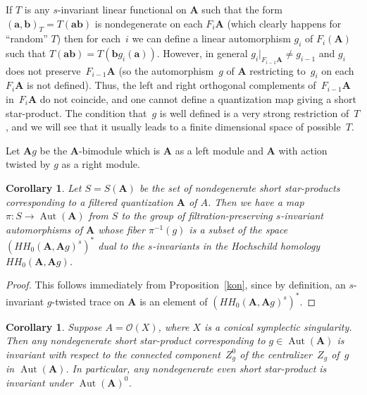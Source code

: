 \documentclass[pdftex]{sigma}
\numberwithin{equation}{section}
\newtheorem{Corollary}[Theorem]{Corollary}
\begin{document}
\begin{Remark} If $T$ is any $s$-invariant linear functional on ${\mathbf A}$ such that the form $({\mathbf a},{\mathbf b})_T=T({\mathbf a}{\mathbf b})$ is nondegenerate on each $F_i{\mathbf A}$ (which clearly happens for ``random'' $T$) then for each~$i$ we can define a linear automorphism $g_i$ of $F_i({\mathbf A})$ such that $T({\textbf{ab}})=T({\mathbf b}g_i({\mathbf a}))$. However, in general $g_i|_{F_{i-1}{\mathbf A}}\ne g_{i-1}$ and $g_i$ does not preserve~$F_{i-1}{\mathbf A}$ (so the automorphism~$g$ of ${\mathbf A}$ restricting to~$g_i$ on each $F_i{\mathbf A}$ is not defined). Thus, the left and right orthogonal complements of~$F_{i-1}{\mathbf A}$ in~$F_i{\mathbf A}$ do not coincide, and one cannot define a quantization map giving a short star-product. The condition that~$g$ is well defined is a very strong restriction of~$T$, and we will see that it usually leads to a finite dimensional space of possible~$T$.
\end{Remark}

Let ${\mathbf A}g$ be the ${\mathbf A}$-bimodule which is ${\mathbf A}$ as a left module and ${\mathbf A}$ with action twisted by $g$ as a right module.

\begin{Corollary}\label{bun} Let $S=S({\mathbf A})$ be the set of nondegenerate short star-products corresponding to a filtered quantization ${{\mathbf A}}$ of $A$. Then we have a map $\pi\colon S\to \operatorname{Aut}({{\mathbf A}})$ from $S$ to the group of filtration-preserving $s$-invariant automorphisms of ${{\mathbf A}}$ whose fiber $\pi^{-1}(g)$ is a subset of the space $(HH_0({{\mathbf A}},{{\mathbf A}}g)^s)^*$ dual to the $s$-invariants in the Hochschild homology $HH_0({{\mathbf A}},{{\mathbf A}}g)$.
\end{Corollary}

\begin{proof} This follows immediately from Proposition~\ref{kon}, since by definition, an $s$-invariant $g$-twisted trace on ${{\mathbf A}}$ is an element of $(HH_0({{\mathbf A}},{{\mathbf A}}g)^s)^*$.
\end{proof}

\begin{Corollary} \label{bun1} Suppose $A=\mathcal{O}(X)$, where $X$ is a conical symplectic
singularity. Then any nondegenerate short star-product corresponding to $g\in \operatorname{Aut}({{\mathbf A}})$
is invariant with respect to the connected component~$Z_g^0$ of the centralizer~$Z_g$
of~$g$ in $\operatorname{Aut}({{\mathbf A}})$. In particular, any nondegenerate even short star-product
is invariant under $\operatorname{Aut}({\mathbf A})^0$.
\end{Corollary}
\end{document}
